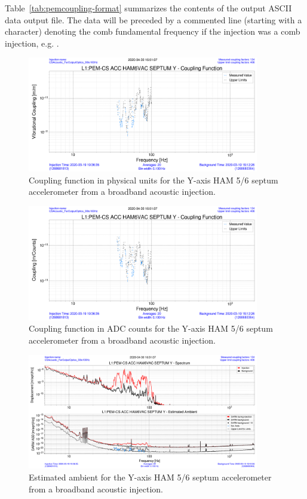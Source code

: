 Table~\ref{tab:pemcoupling-format} summarizes the contents of the output ASCII data output file.
The data will be preceded by a commented line (starting with a \code{\#} character) denoting the comb fundamental frequency if the injection was a comb injection, e.g. .

\begin{figure}
  \centering
  \includegraphics[width=0.9\textwidth]{figures/appendix/pemcoupling-cf-physical.png}
  \caption{Coupling function in physical units for the Y-axis HAM 5/6 septum accelerometer from a broadband acoustic injection.}
  \label{fig:pemcoupling-cf-physical}
\end{figure}

\begin{figure}
  \centering
  \includegraphics[width=0.9\textwidth]{figures/appendix/pemcoupling-cf-raw.png}
  \caption{Coupling function in ADC counts for the Y-axis HAM 5/6 septum accelerometer from a broadband acoustic injection.}
  \label{fig:pemcoupling-cf-raw}
\end{figure}

\begin{figure}
  \centering
  \includegraphics[width=0.9\textwidth]{figures/appendix/pemcoupling-cf-ambient.png}
  \caption{Estimated ambient for the Y-axis HAM 5/6 septum accelerometer from a broadband acoustic injection.}
  \label{fig:pemcoupling-cf-ambient}
\end{figure}

